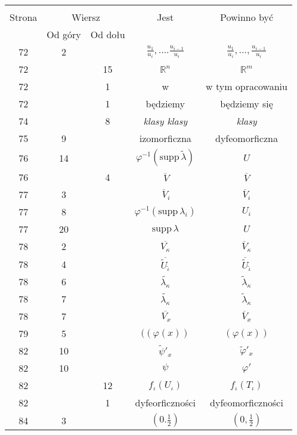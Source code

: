 \documentclass[a4paper,11pt]{article}
\newcommand{\fr}{\frac}
\newcommand{\mb}{\mathbb}
\newcommand{\mr}{\mathrm}
\newcommand{\ol}{\overline}
\newcommand{\ld}{\ldots}
\newcommand{\supp}{\mr{supp}}
\newcommand{\vp}{\varphi}
\newcommand{\io}{\iota}
\newcommand{\ka}{\kappa}
\newcommand{\la}{\lambda}
\newcommand{\R}{\mb{R}}
\newcommand{\wt}{\widetilde}
\begin{document}
\begin{center}
  \begin{tabular}{|c|c|c|c|c|}
    \hline
    & \multicolumn{2}{c|}{} & & \\
    Strona & \multicolumn{2}{c|}{Wiersz}& Jest & Powinno być \\ \cline{2-3}
    & Od góry & Od dołu &  &  \\ \hline
    72 & 2 & & $\fr{ u_{ 1 } }{ u_{ i } },
               \ld. \fr{ u_{ i - 1 } }{ u_{ i } }$
           & $\fr{ u_{ 1 } }{ u_{ i } }, \ld,
             \fr{ u_{ i - 1 } }{ u_{ i } }$ \\
    72 & & 15 & $\R^{ n }$ & $\R^{ m }$ \\
    72 & &  1 & w & w tym opracowaniu \\
    72 & &  1 & będziemy & będziemy się \\
    74 & &  8 & \emph{klasy klasy} & \emph{klasy} \\
    75 &  9 & & izomorficzna & dyfeomorficzna \\
    76 & 14 & & $\vp^{ -1 }( \supp \, \wt{ \la } )$ & $U$ \\
    76 & & 4 & $\ol{ \, V }$ & $\ol{ V }$ \\
    77 & 3 & & $\ol{\, V}_{ i }$ & $\ol{ V }_{ i }$ \\
    77 &  8 & & $\vp^{ -1 }( \supp \, \la_{ i } )$ & $U_{ i }$ \\
    77 & 20 & & $\supp \, \la$ & $U$ \\
    78 &  2 & & $\ol{ V_{ \ka } }$ & $\ol{ V }_{ \ka }$ \\
    78 &  4 & & $\ol{ \wt{ U }_{ \tilde{ \io } } }$
           & $\ol{ \wt{ U } }_{ \tilde{ \io } }$ \\
    78 &  6 & & $\wt{ \la_{ \ka } }$
           & $\wt{ \la }_{ \ka }$ \\
    78 &  7 & & $\wt{ \la_{ \ka } }$
           & $\wt{ \la }_{ \ka }$ \\
    78 &  7 & & $\ol{ \, V_{ x } }$ & $\ol{ V }_{ x }$ \\
    79 &  5 & & $( ( \vp( x ) )$ & $( \vp( x ) )$ \\
    82 & 10 & & $\wt{ \psi }'_{ x }$
           & $\wt{ \vp }'_{ x }$ \\
    82 & 10 & & $\psi$ & $\vp'$ \\
    82 & & 12 & $f_{ \io }( U_{ \io } )$ & $f_{ \io }( T_{ \io } )$ \\
    82 & &  1 & dyfeorficzności & dyfeomorficzności \\
    84 & 3 & & $( 0. \fr{ 1 }{ 2 } )$ & $( 0, \fr{ 1 }{ 2 } )$ \\

\end{tabular}
\end{center}
\end{document}
